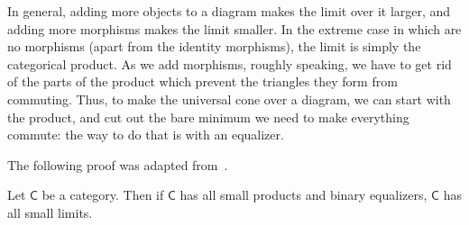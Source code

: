 \documentclass[main.tex]{subfiles}
\begin{document}
In general, adding more objects to a diagram makes the limit over it larger, and adding more morphisms makes the limit smaller. In the extreme case in which are no morphisms (apart from the identity morphisms), the limit is simply the categorical product. As we add morphisms, roughly speaking, we have to get rid of the parts of the product which prevent the triangles they form from commuting. Thus, to make the universal cone over a diagram, we can start with the product, and cut out the bare minimum we need to make everything commute: the way to do that is with an equalizer.

The following proof was adapted from~\cite{awodey-category-theory}.
\begin{theorem}
  \label{thm:criterionforfinitelimits}
  Let $\mathsf{C}$ be a category. Then if $\mathsf{C}$ has all small products and binary equalizers, $\mathsf{C}$ has all small limits.

\end{theorem}
\end{document}
